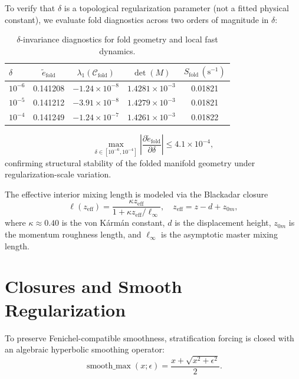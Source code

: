 \documentclass[11pt]{article}
\begin{document}
To verify that $\delta$ is a topological regularization parameter (not a fitted physical constant), we evaluate fold diagnostics across two orders of magnitude in $\delta$:
\begin{table}[htbp]
\centering
\caption{$\delta$-invariance diagnostics for fold geometry and local fast dynamics.}
\label{tab:delta_invariance}
\begin{tabular}{lcccc}
\toprule
$\delta$ & $\tilde{e}_{\text{fold}}$ & $\lambda_1(\mathcal{C}_{\text{fold}})$ & $\det(M)$ & $S_{\text{fold}}\,(\mathrm{s}^{-1})$ \\
\midrule
$10^{-6}$ & 0.141208 & $-1.24 \times 10^{-8}$ & $1.4281 \times 10^{-3}$ & 0.01821 \\
$10^{-5}$ & 0.141212 & $-3.91 \times 10^{-8}$ & $1.4279 \times 10^{-3}$ & 0.01821 \\
$10^{-4}$ & 0.141249 & $-1.24 \times 10^{-7}$ & $1.4261 \times 10^{-3}$ & 0.01822 \\
\bottomrule
\end{tabular}
\end{table}
\begin{equation}
\max_{\delta \in [10^{-6},10^{-4}]}
\left\lvert
\frac{\partial \tilde{e}_{\text{fold}}}{\partial \delta}
\right\rvert
\le 4.1 \times 10^{-4},
\end{equation}
confirming structural stability of the folded manifold geometry under regularization-scale variation.

The effective interior mixing length is modeled via the Blackadar closure
\begin{equation}
\ell(z_{\text{eff}}) = \frac{\kappa z_{\text{eff}}}{1 + \kappa z_{\text{eff}}/\ell_\infty}, \quad z_{\text{eff}} = z - d + z_{0m},
\label{eq:blackadar_length}
\end{equation}
where $\kappa \approx 0.40$ is the von Kármán constant, $d$ is the displacement height, $z_{0m}$ is the momentum roughness length, and $\ell_\infty$ is the asymptotic master mixing length.

\section{Closures and Smooth Regularization}
\label{sec:closures}

To preserve Fenichel-compatible smoothness, stratification forcing is closed with an algebraic hyperbolic smoothing operator:
\begin{equation}
\operatorname{smooth\_max}(x;\epsilon)=\frac{x+\sqrt{x^2+\epsilon^2}}{2}.
\label{eq:smooth_max_closure}
\end{equation}
\end{document}
